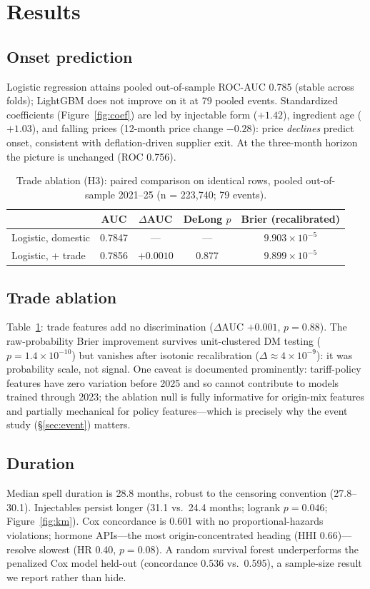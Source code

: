 \documentclass[11pt]{article}
\begin{document}
\section{Results}
\subsection{Onset prediction}
Logistic regression attains pooled out-of-sample ROC-AUC 0.785 (stable across folds); LightGBM does not improve on it at 79 pooled events. Standardized coefficients (Figure~\ref{fig:coef}) are led by injectable form ($+1.42$), ingredient age ($+1.03$), and falling prices (12-month price change $-0.28$): price \emph{declines} predict onset, consistent with deflation-driven supplier exit. At the three-month horizon the picture is unchanged (ROC 0.756).

\begin{table}[H]\centering\small
\caption{Trade ablation (H3): paired comparison on identical rows, pooled out-of-sample 2021--25 (n = 223{,}740; 79 events).}
\begin{tabular}{lcccc}
\toprule
 & AUC & $\Delta$AUC & DeLong $p$ & Brier (recalibrated) \\
\midrule
Logistic, domestic & 0.7847 & --- & --- & $9.903\times10^{-5}$ \\
Logistic, + trade  & 0.7856 & $+0.0010$ & 0.877 & $9.899\times10^{-5}$ \\
\bottomrule
\end{tabular}
\label{tab:ablation}
\end{table}

\subsection{Trade ablation}
Table~\ref{tab:ablation}: trade features add no discrimination ($\Delta$AUC $+0.001$, $p=0.88$). The raw-probability Brier improvement survives unit-clustered DM testing ($p=1.4\times10^{-10}$) but vanishes after isotonic recalibration ($\Delta \approx 4\times10^{-9}$): it was probability scale, not signal. One caveat is documented prominently: tariff-policy features have zero variation before 2025 and so cannot contribute to models trained through 2023; the ablation null is fully informative for origin-mix features and partially mechanical for policy features---which is precisely why the event study (\S\ref{sec:event}) matters.

\subsection{Duration}
Median spell duration is 28.8 months, robust to the censoring convention (27.8--30.1). Injectables persist longer (31.1 vs.\ 24.4 months; logrank $p=0.046$; Figure~\ref{fig:km}). Cox concordance is 0.601 with no proportional-hazards violations; hormone APIs---the most origin-concentrated heading (HHI 0.66)---resolve slowest (HR 0.40, $p=0.08$). A random survival forest underperforms the penalized Cox model held-out (concordance 0.536 vs.\ 0.595), a sample-size result we report rather than hide.
\end{document}
